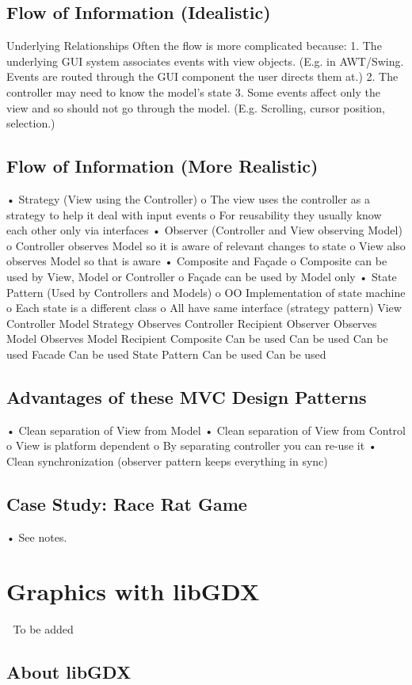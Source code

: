 \documentclass[11pt]{article}
\begin{document}
\subsection{Flow of Information (Idealistic)}
Underlying Relationships
Often the flow is more complicated because:
1. The underlying GUI system associates events with view objects. (E.g. in AWT/Swing. Events are
routed through the GUI component the user directs them at.)
2. The controller may need to know the model’s state
3. Some events affect only the view and so should not go through the model. (E.g. Scrolling, cursor
position, selection.)
\subsection{Flow of Information (More Realistic)}
• Strategy (View using the Controller)
o The view uses the controller as a strategy to help it deal with input events
o For reusability they usually know each other only via interfaces
• Observer (Controller and View observing Model)
o Controller observes Model so it is aware of relevant changes to state
o View also observes Model so that is aware
• Composite and Façade
o Composite can be used by View, Model or Controller
o Façade can be used by Model only
• State Pattern (Used by Controllers and Models)
o OO Implementation of state machine
o Each state is a different class
o All have same interface (strategy pattern)
View Controller Model
Strategy Observes Controller Recipient
Observer Observes Model Observes Model Recipient
Composite Can be used Can be used Can be used
Facade Can be used
State Pattern Can be used Can be used
\subsection{Advantages of these MVC Design Patterns}
• Clean separation of View from Model
• Clean separation of View from Control
o View is platform dependent
o By separating controller you can re-use it
• Clean synchronization (observer pattern keeps everything in sync)
\subsection{Case Study: Race Rat Game}
• See notes.
\section{Graphics with libGDX}
 To be added
\subsection{About libGDX}
\end{document}
